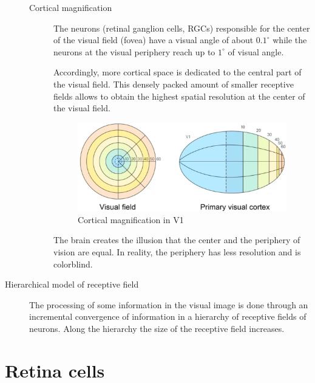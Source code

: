 \begin{description}
\begin{description}
            \item[Cortical magnification] 
                The neurons (retinal ganglion cells, RGCs) responsible for the center of the visual field (fovea)
                have a visual angle of about $0.1^\circ$ while the neurons at the visual periphery reach up to $1^\circ$ of visual angle.

                Accordingly, more cortical space is dedicated to the central part of the visual field.
                This densely packed amount of smaller receptive fields allows to obtain the highest spatial resolution at the center of the visual field.

                \begin{figure}[H]
                    \centering
                    \includegraphics[width=0.4\linewidth]{./img/cortical_magnification.png}
                    \caption{Cortical magnification in V1}
                \end{figure}

                \begin{remark}
                    The brain creates the illusion that the center and the periphery of vision are equal.
                    In reality, the periphery has less resolution and is colorblind.
                \end{remark}
        \end{description}

    \item[Hierarchical model of receptive field]
        The processing of some information in the visual image is done through an incremental convergence of information
        in a hierarchy of receptive fields of neurons.
        Along the hierarchy the size of the receptive field increases.
\end{description}


\section{Retina cells}

